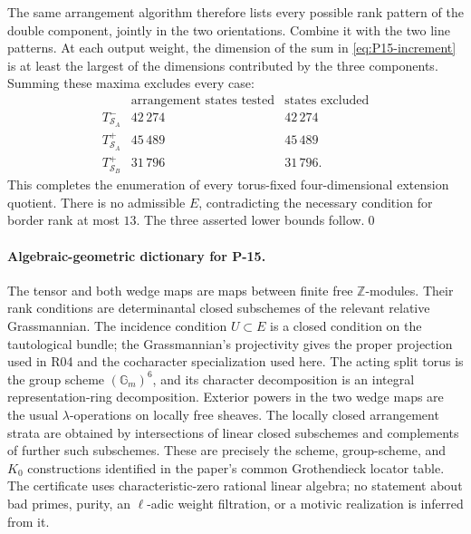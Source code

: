 The same arrangement algorithm therefore lists every possible rank
pattern of the double component, jointly in the two orientations.
Combine it with the two line patterns.  At each output weight, the
dimension of the sum in \eqref{eq:P15-increment} is at least the largest
of the dimensions contributed by the three components.  Summing these
maxima excludes every case:
\[
\begin{array}{c|r|r}
 &\text{arrangement states tested}&\text{states excluded}\\\hline
 T^-_{\mathcal S_A}&42\,274&42\,274\\
 T^+_{\mathcal S_A}&45\,489&45\,489\\
 T^+_{\mathcal S_B}&31\,796&31\,796.
\end{array}
\]
This completes the enumeration of every torus-fixed four-dimensional
extension quotient.  There is no admissible $E$, contradicting the
necessary condition for border rank at most $13$.  The three asserted
lower bounds follow.\qed

\paragraph{Algebraic-geometric dictionary for P-15.}
The tensor and both wedge maps are maps between finite free
$\mathbb Z$-modules.  Their rank conditions are determinantal closed
subschemes of the relevant relative Grassmannian.  The incidence
condition $U\subset E$ is a closed condition on the tautological bundle;
the Grassmannian's projectivity gives the proper projection used in R04
and the cocharacter specialization used here.  The acting split torus is
the group scheme $(\mathbb G_m)^6$, and its character decomposition is
an integral representation-ring decomposition.  Exterior powers in the
two wedge maps are the usual $\lambda$-operations on locally free sheaves.
The locally closed arrangement strata are obtained by intersections of
linear closed subschemes and complements of further such subschemes.
These are precisely the scheme, group-scheme, and $K_0$ constructions
identified in the paper's common Grothendieck locator table.
The certificate uses characteristic-zero rational linear algebra;
no statement about bad primes, purity, an $\ell$-adic weight filtration,
or a motivic realization is inferred from it.

